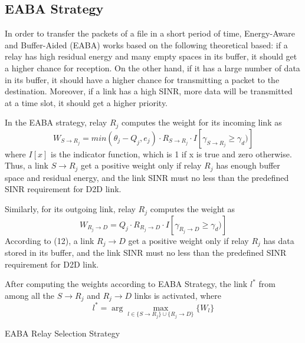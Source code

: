 \documentclass[conference]{IEEEtran}
\begin{document}
\subsection{EABA Strategy}
In order to transfer the packets of a file in a short period of time, Energy-Aware and Buffer-Aided (EABA) works based on the following theoretical based: if a relay has high residual energy and many empty spaces in its buffer, it should get a higher chance for reception. On the other hand, if it has a large number of data in its buffer, it should have a higher chance for transmitting a packet to the destination. Moreover, if a link has a high SINR, more data will be transmitted at a time slot, it should get a higher priority.

In the EABA strategy, relay $R_j$ computes the weight for its incoming link as
\begin{equation}
W_{S\rightarrow R_j} = min(\theta_j - Q_j,e_j) \cdot R_{S\rightarrow R_j} \cdot I[\gamma_{S\rightarrow R_j} \geq \gamma_d)]
\end{equation}
where $I[x]$ is the indicator function, which is 1 if x is true and zero otherwise. Thus, a link $S \rightarrow R_j$ get a positive weight only if relay $R_j$ has enough buffer space and residual energy, and the link SINR must no less than the predefined SINR requirement for D2D link.

Similarly, for its outgoing link, relay $R_j$ computes the weight as
\begin{equation}
W_{R_j \rightarrow D} = Q_j \cdot R_{R_j \rightarrow D} \cdot I[\gamma_{R_j \rightarrow D} \geq \gamma_d)]
\end{equation}
According to (12), a link $R_j \rightarrow D$ get a positive weight only if relay $R_j$ has data stored in its buffer, and the link SINR must no less than the predefined SINR requirement for D2D link.

After computing the weights according to EABA Strategy, the link $l^*$ from among all the $S \rightarrow R_j$ and $R_j \rightarrow D$ links is activated, where
\begin{equation}
l^* = \arg \max_{l \in \{S \rightarrow R_j\} \cup \{R_j \rightarrow D\}}\{W_l\}
\end{equation}

\begin{algorithm}[!t]
\caption{EABA Relay Selection Strategy}
\begin{algorithmic} [1]
\end{algorithmic}
\end{algorithm}
\end{document}

